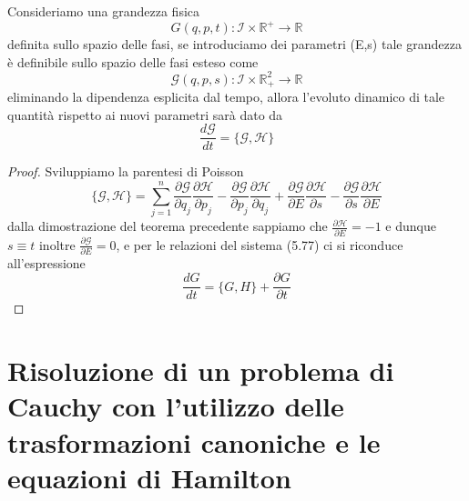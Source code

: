 \begin{theorem}
	Consideriamo una grandezza fisica 
	\begin{equation*}
		G(q,p,t) : \mathcal{I} \times \mathbb{R}^+ \rightarrow \mathbb{R}
	\end{equation*}
	definita sullo spazio delle fasi, se introduciamo dei parametri (E,s) tale grandezza \`{e} definibile sullo spazio delle fasi esteso come
	\begin{equation}
		\mathcal{G}(q,p,s): \mathcal{I} \times \mathbb{R}^2_+ \rightarrow \mathbb{R}
	\end{equation}
eliminando la dipendenza esplicita dal tempo, allora l'evoluto dinamico di tale quantit\`{a} rispetto ai nuovi parametri sar\`{a} dato da 
\begin{equation}
	\frac{d\mathcal{G}}{dt} = \{\mathcal{G},\mathcal{H} \}
\end{equation}
\end{theorem}
\begin{proof}
Sviluppiamo la parentesi di Poisson 
\begin{equation}
	\{\mathcal{G},\mathcal{H} \} = \sum_{j=1}^n \frac{\partial \mathcal{G}}{\partial q_j} \frac{\partial \mathcal{H}}{\partial p_j}-\frac{\partial \mathcal{G}}{\partial p_j} \frac{\partial \mathcal{H}}{\partial q_j}+\frac{\partial \mathcal{G}}{\partial E} \frac{\partial \mathcal{H}}{\partial s}-\frac{\partial \mathcal{G}}{\partial s} \frac{\partial \mathcal{H}}{\partial E}
\end{equation}
dalla dimostrazione del teorema precedente sappiamo che $\frac{\partial \mathcal{H}}{\partial E} = -1$ e dunque $s \equiv t$ inoltre $\frac{\partial \mathcal{G}}{\partial E} = 0 $, e per le relazioni del sistema (5.77) ci si riconduce all'espressione  
\begin{equation*}
	\frac{d G}{dt} = \Big \{ G,H \Big \} + \frac{\partial G}{\partial t}
\end{equation*}
\end{proof}

\section{Risoluzione di un problema di Cauchy con l'utilizzo delle trasformazioni canoniche e le equazioni di Hamilton}

